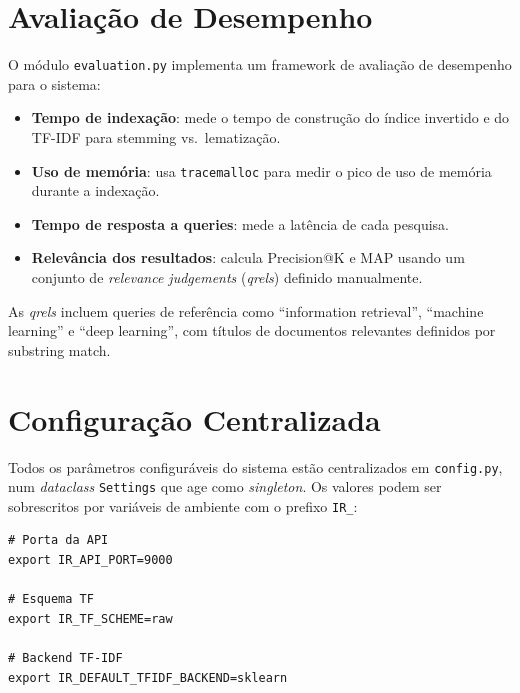 \documentclass[12pt,a4paper]{article}
\begin{document}
\section{Avaliação de Desempenho}

O módulo \texttt{evaluation.py} implementa um framework de avaliação de desempenho para o sistema:

\begin{itemize}
    \item \textbf{Tempo de indexação}: mede o tempo de construção do índice invertido e do TF-IDF para stemming vs.\ lematização.
    \item \textbf{Uso de memória}: usa \texttt{tracemalloc} para medir o pico de uso de memória durante a indexação.
    \item \textbf{Tempo de resposta a queries}: mede a latência de cada pesquisa.
    \item \textbf{Relevância dos resultados}: calcula Precision@K e MAP usando um conjunto de \emph{relevance judgements} (\emph{qrels}) definido manualmente.
\end{itemize}

As \emph{qrels} incluem queries de referência como ``information retrieval'', ``machine learning'' e ``deep learning'', com títulos de documentos relevantes definidos por substring match.

\section{Configuração Centralizada}

Todos os parâmetros configuráveis do sistema estão centralizados em \texttt{config.py}, num \emph{dataclass} \texttt{Settings} que age como \emph{singleton}. Os valores podem ser sobrescritos por variáveis de ambiente com o prefixo \texttt{IR\_}:

\begin{lstlisting}[caption={Exemplo de override por variável de ambiente}]
# Porta da API
export IR_API_PORT=9000

# Esquema TF
export IR_TF_SCHEME=raw

# Backend TF-IDF
export IR_DEFAULT_TFIDF_BACKEND=sklearn
\end{lstlisting}
\end{document}
